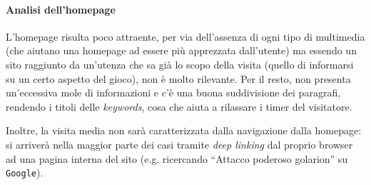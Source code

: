 \paragraph{Analisi dell'homepage} L'homepage risulta poco attraente, per via dell'assenza di ogni tipo di multimedia
(che aiutano una homepage ad essere più apprezzata dall'utente) ma essendo un sito raggiunto da
un'utenza che sa già lo scopo della visita (quello di informarsi su un certo aspetto del gioco), non è molto rilevante. 
Per il resto, non presenta un'eccessiva mole di informazioni e c'è una buona suddivisione dei paragrafi, rendendo i 
titoli delle \emph{keywords}, cosa che aiuta a rilassare i timer del visitatore.\par 
Inoltre, la visita media non sarà caratterizzata dalla navigazione dalla homepage: si arriverà nella maggior parte 
dei casi tramite \emph{deep linking} dal proprio browser ad una pagina interna del sito (e.g. ricercando ``Attacco poderoso golarion''
su \texttt{Google}).